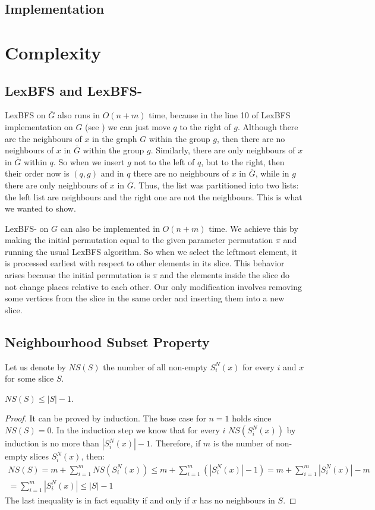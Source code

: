 \subsection{Implementation}

\section{Complexity}
\subsection{LexBFS and LexBFS-}
LexBFS on $\overline{G}$ also runs in $O(n+m)$ time, because in the line 10 of LexBFS implementation on $G$ (see ) we can just move $q$ to the right of $g$. Although there are the neighbours of $x$ in the graph $G$ within the group $g$, then there are no neighbours of $x$ in $\overline{G}$ within the group $g$. Similarly, there are only neighbours of $x$ in $\overline{G}$ within $q$. So when we insert $g$ not to the left of $q$, but to the right, then their order now is $(q, g)$ and in $q$ there are no neighbours of $x$ in $\overline{G}$, while in $g$ there are only neighbours of $x$ in $\overline{G}$. Thus, the list was partitioned into two lists: the left list are neighbours and the right one are not the neighbours. This is what we wanted to show.

LexBFS- on $G$ can also be implemented in $O(n+m)$ time. We achieve this by making the initial permutation equal to the given parameter permutation $\pi$ and running the usual LexBFS algorithm. So when we select the leftmost element, it is processed earliest with respect to other elements in its slice. This behavior arises because the initial permutation is $\pi$ and the elements inside the slice do not change places relative to each other. Our only modification involves removing some vertices from the slice in the same order and inserting them into a new slice. 
\subsection{Neighbourhood Subset Property}
Let us denote by $NS(S)$ the number of all non-empty $S^N_i(x)$ for every $i$ and $x$ for some slice $S$.
\begin{theorem}
    $NS(S) \le |S| - 1$.
\end{theorem}
\begin{proof}
    It can be proved by induction. The base case for $n=1$ holds since $NS(S)=0$. In the induction step we know that
    for every $i$ $NS(S^N_i(x))$ by induction is no more than $|S^N_i(x)| - 1$. Therefore, if $m$ is the number of non-empty slices $S^N_i(x)$, then:
    \begin{align*}
        NS(S) = m + \sum_{i=1}^{m} NS(S^N_i(x)) \le m + \sum_{i=1}^{m} (|S^N_i(x)| - 1) =  m + \sum_{i=1}^{m} |S^N_i(x)| - m \\
        = \sum_{i=1}^{m} |S^N_i(x)| \le |S| - 1
    \end{align*}
    The last inequality is in fact equality if and only if $x$ has no neighbours in $S$.
\end{proof}

